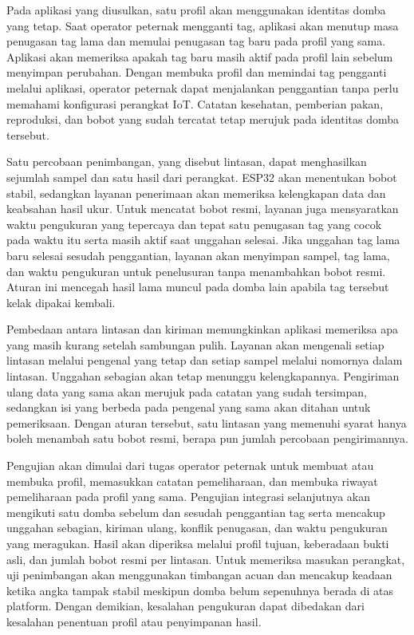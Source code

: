 Pada aplikasi yang diusulkan, satu profil akan menggunakan identitas domba yang tetap.
Saat {\setlength{\fboxsep}{1pt}\colorbox{revisilama}{operator}} {\setlength{\fboxsep}{1pt}\colorbox{revisibaru}{peternak}} mengganti tag, aplikasi akan menutup masa penugasan tag lama dan memulai
penugasan tag baru pada profil yang sama. Aplikasi akan memeriksa apakah tag baru
masih aktif pada profil lain sebelum menyimpan perubahan. Dengan membuka profil dan
memindai tag pengganti melalui aplikasi, {\setlength{\fboxsep}{1pt}\colorbox{revisilama}{operator}} {\setlength{\fboxsep}{1pt}\colorbox{revisibaru}{peternak}} dapat menjalankan penggantian tanpa
perlu memahami konfigurasi perangkat IoT. Catatan kesehatan, pemberian pakan,
reproduksi, dan bobot yang sudah tercatat tetap merujuk pada identitas domba tersebut.

Satu percobaan penimbangan, yang disebut lintasan, dapat menghasilkan sejumlah sampel
dan satu hasil dari perangkat. ESP32 akan menentukan bobot stabil, sedangkan layanan
penerimaan akan memeriksa kelengkapan data dan keabsahan hasil ukur. Untuk mencatat
bobot resmi, layanan juga mensyaratkan waktu pengukuran yang tepercaya dan tepat satu
penugasan tag yang cocok pada waktu itu serta masih aktif saat unggahan selesai.
Jika unggahan tag lama baru
selesai sesudah penggantian, layanan akan menyimpan sampel, tag lama, dan waktu
pengukuran untuk penelusuran tanpa menambahkan bobot resmi. Aturan ini mencegah hasil
lama muncul pada domba lain apabila tag tersebut kelak dipakai kembali.

Pembedaan antara lintasan dan kiriman memungkinkan aplikasi memeriksa apa yang masih
kurang setelah sambungan pulih. Layanan akan mengenali setiap lintasan melalui
pengenal yang tetap dan setiap sampel melalui nomornya dalam lintasan. Unggahan
sebagian akan tetap menunggu kelengkapannya. Pengiriman ulang data yang sama akan
merujuk pada catatan yang sudah tersimpan, sedangkan isi yang berbeda pada pengenal
yang sama akan ditahan untuk pemeriksaan. Dengan aturan tersebut, satu lintasan yang
memenuhi syarat hanya boleh menambah satu bobot resmi, berapa pun jumlah percobaan
pengirimannya.

Pengujian akan dimulai dari tugas {\setlength{\fboxsep}{1pt}\colorbox{revisilama}{operator}} {\setlength{\fboxsep}{1pt}\colorbox{revisibaru}{peternak}} untuk membuat atau membuka profil, memasukkan
catatan pemeliharaan, dan membuka riwayat pemeliharaan pada profil yang sama.
Pengujian integrasi selanjutnya akan mengikuti satu domba sebelum dan sesudah
penggantian tag serta mencakup unggahan sebagian, kiriman ulang, konflik penugasan,
dan waktu pengukuran yang meragukan. Hasil akan diperiksa melalui profil tujuan,
keberadaan bukti asli, dan jumlah bobot resmi per lintasan. Untuk memeriksa masukan
perangkat, uji penimbangan akan menggunakan timbangan acuan dan mencakup keadaan
ketika angka tampak stabil meskipun domba belum sepenuhnya berada di atas platform.
Dengan demikian, kesalahan pengukuran dapat dibedakan dari kesalahan penentuan profil
atau penyimpanan hasil.
